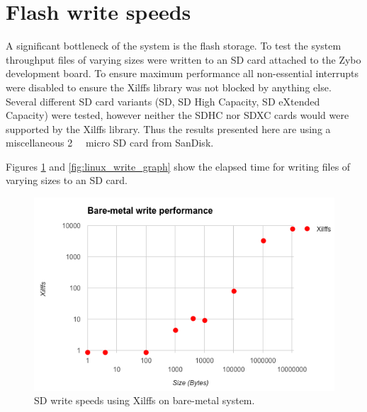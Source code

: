 \section{Flash write speeds}

A significant bottleneck of the system is the flash storage. To test the system throughput files of varying sizes were written to an SD card attached to the Zybo development board. To ensure maximum performance all non-essential interrupts were disabled to ensure the Xilffs library was not blocked by anything else. Several different SD card variants (SD, SD High Capacity, SD eXtended Capacity) were tested, however neither the SDHC nor SDXC cards would were supported by the Xilffs library. Thus the results presented here are using a miscellaneous \SI{2}{\giga\byte} micro SD card from SanDisk.

Figures \ref{fig:standalone_write_graph} and \ref{fig:linux_write_graph} show the elapsed time for writing files of varying sizes to an SD card. 

\begin{figure}
  \centering
  \includegraphics[width=1\textwidth]{./img/standalone_write_graph.png}
  \caption{SD write speeds using Xilffs on bare-metal system.}
  \label{fig:standalone_write_graph}
\end{figure}

